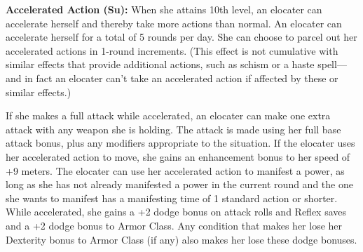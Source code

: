 {\textbf{Accelerated Action (Su):} When she attains 10th level, an elocater can accelerate herself and thereby take more actions than normal. An elocater can accelerate herself for a total of 5 rounds per day. She can choose to parcel out her accelerated actions in 1-round increments. (This effect is not cumulative with similar effects that provide additional actions, such as schism or a haste spell---and in fact an elocater can't take an accelerated action if affected by these or similar effects.)

If she makes a full attack while accelerated, an elocater can make one extra attack with any weapon she is holding. The attack is made using her full base attack bonus, plus any modifiers appropriate to the situation. If the elocater uses her accelerated action to move, she gains an enhancement bonus to her speed of +9 meters. The elocater can use her accelerated action to manifest a power, as long as she has not already manifested a power in the current round and the one she wants to manifest has a manifesting time of 1 standard action or shorter. While accelerated, she gains a +2 dodge bonus on attack rolls and Reflex saves and a +2 dodge bonus to Armor Class. Any condition that makes her lose her Dexterity bonus to Armor Class (if any) also makes her lose these dodge bonuses.
}